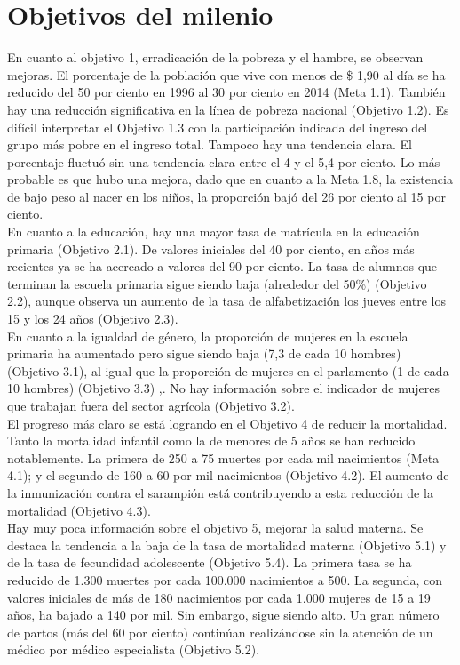 \section{Objetivos del milenio}
En cuanto al objetivo 1, erradicación de la pobreza y el hambre, se observan mejoras. El porcentaje de la población que vive con menos de \$ 1,90 al día se ha reducido del 50 por ciento en 1996 al 30 por ciento en 2014 (Meta 1.1). También hay una reducción significativa en la línea de pobreza nacional (Objetivo 1.2). Es difícil interpretar el Objetivo 1.3 con la participación indicada del ingreso del grupo más pobre en el ingreso total. Tampoco hay una tendencia clara. El porcentaje fluctuó sin una tendencia clara entre el 4 y el 5,4 por ciento. Lo más probable es que hubo una mejora, dado que en cuanto a la Meta 1.8, la existencia de bajo peso al nacer en los niños, la proporción bajó del 26 por ciento al 15 por ciento.\\
En cuanto a la educación, hay una mayor tasa de matrícula en la educación primaria (Objetivo 2.1). De valores iniciales del 40 por ciento, en años más recientes ya se ha acercado a valores del 90 por ciento. La tasa de alumnos que terminan la escuela primaria sigue siendo baja (alrededor del 50\%) (Objetivo 2.2), aunque observa un aumento de la tasa de alfabetización los jueves entre los 15 y los 24 años (Objetivo 2.3).\\
En cuanto a la igualdad de género, la proporción de mujeres en la escuela primaria ha aumentado pero sigue siendo baja (7,3 de cada 10 hombres) (Objetivo 3.1), al igual que la proporción de mujeres en el parlamento (1 de cada 10 hombres) (Objetivo 3.3) ,. No hay información sobre el indicador de mujeres que trabajan fuera del sector agrícola (Objetivo 3.2).\\
El progreso más claro se está logrando en el Objetivo 4 de reducir la mortalidad. Tanto la mortalidad infantil como la de menores de 5 años se han reducido notablemente. La primera de 250 a 75 muertes por cada mil nacimientos (Meta 4.1); y el segundo de 160 a 60 por mil nacimientos (Objetivo 4.2). El aumento de la inmunización contra el sarampión está contribuyendo a esta reducción de la mortalidad (Objetivo 4.3).\\
Hay muy poca información sobre el objetivo 5, mejorar la salud materna. Se destaca la tendencia a la baja de la tasa de mortalidad materna (Objetivo 5.1) y de la tasa de fecundidad adolescente (Objetivo 5.4). La primera tasa se ha reducido de 1.300 muertes por cada 100.000 nacimientos a 500. La segunda, con valores iniciales de más de 180 nacimientos por cada 1.000 mujeres de 15 a 19 años, ha bajado a 140 por mil. Sin embargo, sigue siendo alto. Un gran número de partos (más del 60 por ciento) continúan realizándose sin la atención de un médico por médico especialista (Objetivo 5.2).\\
